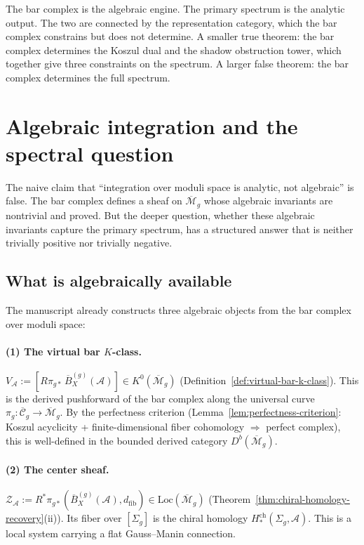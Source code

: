 \documentclass[11pt]{article}
\newcommand{\cA}{\mathcal{A}}
\newcommand{\cC}{\mathcal{C}}
\newcommand{\cM}{\mathcal{M}}
\newcommand{\cZ}{\mathcal{Z}}
\newcommand{\barB}{\overline{B}}
\newcommand{\dfib}{d_{\mathrm{fib}}}
\begin{document}
\medskip

The bar complex is the algebraic engine.  The primary spectrum
is the analytic output.  The two are connected by the
representation category, which the bar complex constrains but
does not determine.  A smaller true theorem: the bar complex
determines the Koszul dual and the shadow obstruction tower, which together
give three constraints on the spectrum.  A larger false theorem:
the bar complex determines the full spectrum.


\section{Algebraic integration and the spectral question}
\label{sec:algebraic-integration-spectral}

The naive claim that ``integration over moduli space is analytic,
not algebraic'' is false.  The bar complex defines a sheaf on
$\overline{\cM}_g$ whose algebraic invariants are nontrivial
and proved.  But the deeper question, whether these algebraic
invariants capture the primary spectrum, has a structured answer
that is neither trivially positive nor trivially negative.

\subsection{What is algebraically available}

The manuscript already constructs three algebraic objects from
the bar complex over moduli space:

\paragraph{(1) The virtual bar $K$-class.}
$V_\cA := [R\pi_{g*}\,\barB^{(g)}_X(\cA)] \in K^0(\overline{\cM}_g)$
(Definition~\ref{def:virtual-bar-k-class}).  This is the
derived pushforward of the bar complex along the universal curve
$\pi_g\colon \overline{\cC}_g \to \overline{\cM}_g$.  By the
perfectness criterion (Lemma~\ref{lem:perfectness-criterion}:
Koszul acyclicity + finite-dimensional fiber cohomology
$\Rightarrow$ perfect complex), this is well-defined in the
bounded derived category $D^b(\overline{\cM}_g)$.

\paragraph{(2) The center sheaf.}
$\cZ_\cA := R^*\pi_{g*}(\barB^{(g)}_X(\cA), \dfib) \in
\mathrm{Loc}(\overline{\cM}_g)$
(Theorem~\ref{thm:chiral-homology-recovery}(ii)).
Its fiber over $[\Sigma_g]$ is the chiral homology
$H^{\mathrm{ch}}_*(\Sigma_g, \cA)$.  This is a local system
carrying a flat Gauss--Manin connection.
\end{document}
